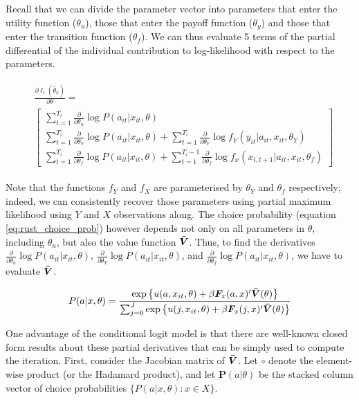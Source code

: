 \documentclass[11pt]{article}
\begin{document}
Recall that we can divide the parameter vector into parameters that enter the utility function ($\theta_u$), those that enter the payoff function ($\theta_y$) and those that enter the transition function ($\theta_f$). We can thus evaluate 5 terms of the partial differential of the individual contribution to log-likelihood with respect to the parameters.

\begin{align}
    \begin{split}
        &\frac{\partial \ell_i(\hat{\theta}_k)}{\partial \theta} = \\
        &\begin{bmatrix}
            \sum_{t=1}^{T_i} \frac{\partial}{\partial \theta_u} \log P(a_{it}|x_{it},\theta) \\
            \sum_{t=1}^{T_i} \frac{\partial}{\partial \theta_Y} \log P(a_{it}|x_{it},\theta) + \sum_{t=1}^{T_i} \frac{\partial}{\partial \theta_Y} \log f_Y(y_{it}|a_{it},x_{it},\theta_Y)\\
            \sum_{t=1}^{T_i} \frac{\partial}{\partial \theta_f} \log P(a_{it}|x_{it},\theta) + \sum_{t=1}^{T_i-1} \frac{\partial}{\partial \theta_f} \log f_x(x_{i,t+1}|a_{it},x_{it},\theta_f)
        \end{bmatrix}
    \end{split}
\end{align}

Note that the functions $f_Y$ and $f_X$ are parameterised by $\theta_Y$ and $\theta_f$ respectively; indeed, we can consistently recover those parameters using partial maximum likelihood using $Y$ and $X$ observations along. The choice probability (equation \ref{eq:rust_choice_prob}) however depends not only on all parameters in $\theta$, including $\theta_u$, but also the value function $\bm{\Bar{V}}$. Thus, to find the derivatives $\frac{\partial}{\partial \theta_u} \log P(a_{it}|x_{it},\theta)$, $\frac{\partial}{\partial \theta_Y} \log P(a_{it}|x_{it},\theta)$, and $\frac{\partial}{\partial \theta_f} \log P(a_{it}|x_{it},\theta)$, we have to evaluate $\bm{\Bar{V}}$.

\begin{equation} \label{eq:rust_choice_prob}
    P(a|x,\theta) = \frac{\exp \left\{ u(a,x_{it},\theta) + \beta \bm{F}_x(a,x)^\prime \bm{\Bar{V}}(\theta)\right\}}{\sum_{j=0}^J \exp \left\{ u(j,x_{it},\theta) + \beta \bm{F}_x(j,x)^\prime \bm{\Bar{V}}(\theta) \right\}}
\end{equation}

One advantage of the conditional logit model is that there are well-known closed form results about these partial derivatives that can be simply used to compute the iteration. First, consider the Jacobian matrix of $\bm{\Bar{V}}$. Let $\circ$ denote the element-wise product (or the Hadamard product), and let $\bm{P}(a|\theta)$ be the stacked column vector of choice probabilities $\{P(a|x,\theta) : x \in X\}$.
\end{document}
